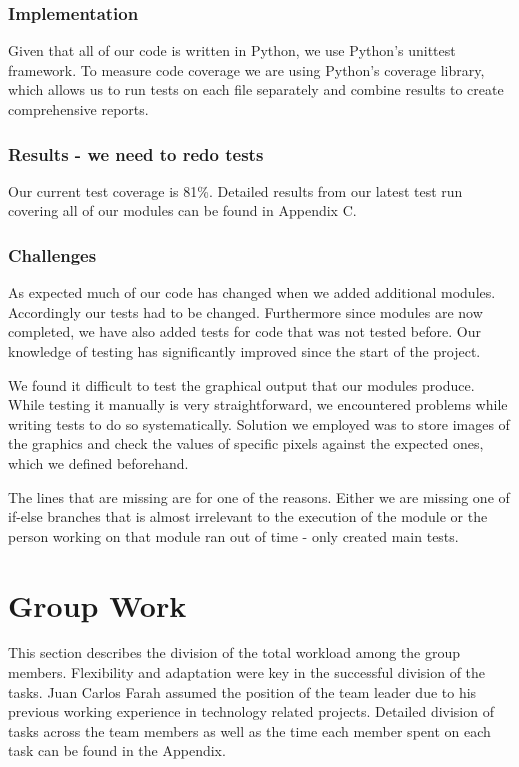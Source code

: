 \documentclass[a4paper,11pt]{article}
\begin{document}
\subsubsection{Implementation}
Given that all of our code is written in Python, we use Python's unittest framework. To measure code coverage we are using Python's coverage library, which allows us to run tests on each file separately and combine results to create comprehensive reports.

\subsubsection{Results - we need to redo tests}
Our current test coverage is 81\%. Detailed results from our latest test run covering all of our modules can be found in Appendix C.

\subsubsection{Challenges}
As expected much of our code has changed when we added additional modules. Accordingly our tests had to be changed. Furthermore since modules are now completed, we have also added tests for code that was not tested before. Our knowledge of testing has significantly improved since the start of the project.

We found it difficult to test the graphical output that our modules produce. While testing it manually is very straightforward, we encountered problems while writing tests to do so systematically. Solution we employed was to store images of the graphics and check the values of specific pixels against the expected ones, which we defined beforehand.

The lines that are missing are for one of the reasons. Either we are missing one of if-else branches that is almost irrelevant to the execution of the module or the person working on that module ran out of time - only created main tests. 
\clearpage
\section{Group Work}

This section describes the division of the total workload among the group members. Flexibility and adaptation were key in the successful division of the tasks. Juan Carlos Farah assumed the position of the team leader due to his previous working experience in technology related projects. Detailed division of tasks across the team members as well as the time each member spent on each task can be found in the Appendix.
\end{document}
